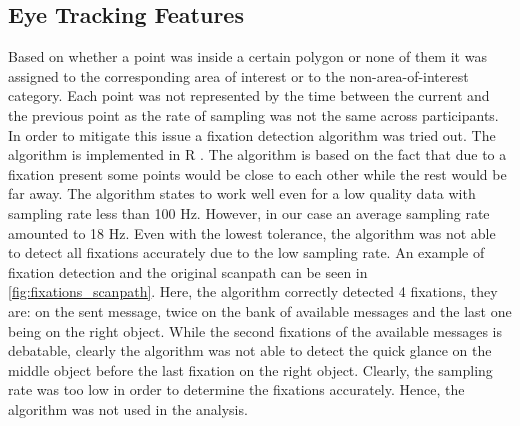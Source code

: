 \subsection{Eye Tracking Features}
\label{sec:analysis:eyetr}
Based on whether a point was inside a certain polygon or none of them it was assigned to the corresponding area of interest or to the non-area-of-interest category. Each point was not represented by the time between the current and the previous point as the rate of sampling was not the same across participants. In order to mitigate this issue a fixation detection algorithm was tried out. The algorithm is implemented in R \citep{fixation_detection}. The algorithm is based on the fact that due to a fixation present some points would be close to each other while the rest would be far away. The algorithm states to work well even for a low quality data with sampling rate less than 100 Hz. However, in our case an average sampling rate amounted to 18 Hz. Even with the lowest tolerance, the algorithm was not able to detect all fixations accurately due to the low sampling rate. An example of fixation detection and the original scanpath can be seen in \autoref{fig:fixations_scanpath}. Here, the algorithm correctly detected 4 fixations, they are: on the sent message, twice on the bank of available messages and the last one being on the right object. While the second fixations of the available messages is debatable, clearly the algorithm was not able to detect the quick glance on the middle object before the last fixation on the right object. Clearly, the sampling rate was too low in order to determine the fixations accurately. Hence, the algorithm was not used in the analysis. 


